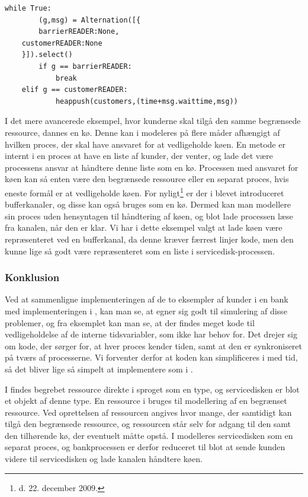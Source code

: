\begin{lstlisting}[float=hbtp,label=bank-alternation-imp,caption=Modtage en 
  kunde eller et barrierekald i bankprocessen]
while True:
		(g,msg) = Alternation([{
		barrierREADER:None,
    customerREADER:None
    }]).select()
		if g == barrierREADER:
			break
    elif g == customerREADER:
			heappush(customers,(time+msg.waittime,msg))
\end{lstlisting}


I det mere avancerede eksempel, hvor kunderne skal tilgå den samme begrænsede 
ressource, dannes en kø. Denne kan i \pycsp modeleres på flere måder afhængigt 
af hvilken proces, der skal have ansvaret for at vedligeholde køen. En metode er 
internt i en proces at have en liste af kunder, der venter, og lade det være 
processens ansvar at håndtere denne liste som en kø. Processen med ansvaret for køen kan 
så enten være den begrænsede ressource eller en separat proces, hvis eneste 
formål er at vedligeholde køen. For nyligt\footnote{d. 22. december 2009.} er 
der i \pycsp blevet introduceret bufferkanaler\cite{pycsp-r147}, og 
disse kan også bruges som en kø. Dermed kan man modellere sin proces uden 
hensyntagen til håndtering af køen, og blot lade processen læse fra kanalen, når den er klar. Vi har i dette eksempel valgt 
at lade køen være repræsenteret ved en bufferkanal, da denne  kræver 
færrest linjer kode, men den kunne lige så godt være repræsenteret som en liste 
i servicedisk-processen.

\subsubsection{Konklusion}
Ved at sammenligne implementeringen af de to eksempler af kunder i en bank med implementeringen i \simpy, kan man se, at \des  egner sig godt til 
simulering af disse problemer, og fra eksemplet kan man se, at der findes meget kode til 
vedligeholdelse af de interne tidsvariabler, som \simpy ikke har behov for. Det drejer sig 
om kode, der sørger for, at hver proces kender tiden, samt at den er 
synkroniseret på tværs af processerne. Vi forventer derfor at koden kan 
simplificeres i \pycsp med tid, så det bliver lige så simpelt at implementere som i 
\simpy. 

I \simpy findes begrebet ressource direkte i sproget som en type, og servicedisken er blot et objekt af denne type. 
En ressource i \simpy bruges til modellering af en begrænset ressource. Ved oprettelsen af ressourcen angives hvor mange, der samtidigt kan tilgå den begrænsede ressource, og ressourcen står selv for adgang til den samt den tilhørende kø, der eventuelt måtte opstå. 
I \pycsp modelleres servicedisken som en separat proces, og 
bankprocessen er derfor reduceret til blot at sende kunden videre til 
servicedisken og lade kanalen håndtere køen. 

